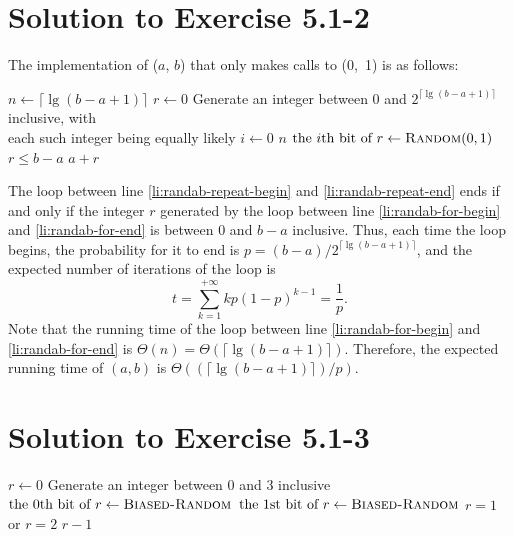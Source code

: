\documentclass[a4paper, fleqn]{article}
\begin{document}
\section*{Solution to Exercise 5.1-2}

The implementation of ($a$, $b$) that only makes calls to
(0,~1) is as follows:

\begin{codebox}
\li  $n \gets \lceil\lg (b - a + 1)\rceil$
\li  \Repeat                                      \label{li:randab-repeat-begin}
         $r \gets 0$
\li      \Comment Generate an integer between 0 and $2^{\lceil\lg (b - a + 1)\rceil}$
                  inclusive, with \\ \>\>\>each such integer being equally likely
\li      \For $i \gets 0$ \To $n$                 \label{li:randab-for-begin}
\li          \Do
                $\mbox{the }i\mbox{th bit of }r \gets \textnormal{\scshape Random}(0, 1)$
             \End                                 \label{li:randab-for-end}
\li  \Until $r \le b - a$                         \label{li:randab-repeat-end}
\li  \Return $a + r$
\end{codebox}

The  loop between line \ref{li:randab-repeat-begin} and
\ref{li:randab-repeat-end} ends if and only if the integer $r$ generated by the
 loop between line \ref{li:randab-for-begin} and \ref{li:randab-for-end}
is between 0 and $b - a$ inclusive. Thus, each time the  loop begins,
the probability for it to end is $p = (b - a)/2^{\lceil\lg (b - a + 1)\rceil}$,
and the expected number of iterations of the  loop is
\[
t = \sum_{k = 1}^{+\infty}kp(1 - p)^{k - 1} = \frac{1}{p}.
\]
Note that the running time of the  loop between line
\ref{li:randab-for-begin} and \ref{li:randab-for-end} is
$\Theta(n) = \Theta(\lceil\lg (b - a + 1)\rceil)$. Therefore, the expected running
time of $(a,b)$ is $\Theta((\lceil\lg (b - a + 1)\rceil) / p)$.








\section*{Solution to Exercise 5.1-3}

\begin{codebox}
\li  \Repeat                                      \label{li:rand-repeat-begin}
         $r \gets 0$
\li      \Comment Generate an integer between 0 and 3 inclusive
\li      $\mbox{the 0th bit of } r \gets \textnormal{\scshape Biased-Random}$
                                                  \label{li:rand-gen-r-0}
\li      $\mbox{the 1st bit of } r \gets \textnormal{\scshape Biased-Random}$
                                                  \label{li:rand-gen-r-1}
\li  \Until $r = 1$ or $r = 2$                    \label{li:rand-repeat-end}
\li  \Return $r - 1$
\end{codebox}
\end{document}
